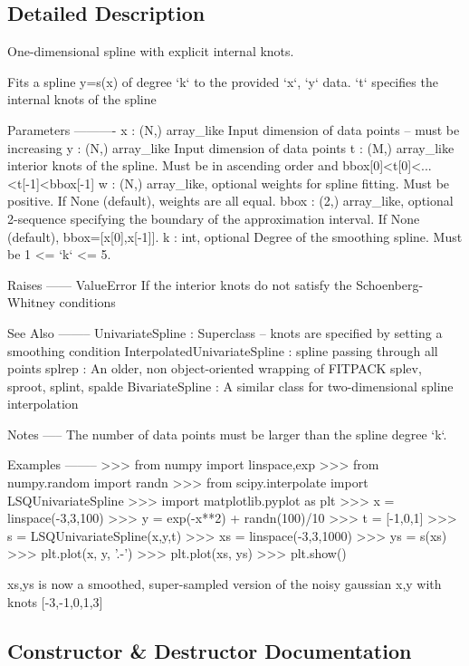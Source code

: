 \subsection{Detailed Description}
\begin{DoxyVerb}One-dimensional spline with explicit internal knots.

Fits a spline y=s(x) of degree `k` to the provided `x`, `y` data.  `t`
specifies the internal knots of the spline

Parameters
----------
x : (N,) array_like
    Input dimension of data points -- must be increasing
y : (N,) array_like
    Input dimension of data points
t : (M,) array_like
    interior knots of the spline.  Must be in ascending order
    and bbox[0]<t[0]<...<t[-1]<bbox[-1]
w : (N,) array_like, optional
    weights for spline fitting.  Must be positive.  If None (default),
    weights are all equal.
bbox : (2,) array_like, optional
    2-sequence specifying the boundary of the approximation interval. If
    None (default), bbox=[x[0],x[-1]].
k : int, optional
    Degree of the smoothing spline.  Must be 1 <= `k` <= 5.

Raises
------
ValueError
    If the interior knots do not satisfy the Schoenberg-Whitney conditions

See Also
--------
UnivariateSpline : Superclass -- knots are specified by setting a
    smoothing condition
InterpolatedUnivariateSpline : spline passing through all points
splrep : An older, non object-oriented wrapping of FITPACK
splev, sproot, splint, spalde
BivariateSpline : A similar class for two-dimensional spline interpolation

Notes
-----
The number of data points must be larger than the spline degree `k`.

Examples
--------
>>> from numpy import linspace,exp
>>> from numpy.random import randn
>>> from scipy.interpolate import LSQUnivariateSpline
>>> import matplotlib.pyplot as plt
>>> x = linspace(-3,3,100)
>>> y = exp(-x**2) + randn(100)/10
>>> t = [-1,0,1]
>>> s = LSQUnivariateSpline(x,y,t)
>>> xs = linspace(-3,3,1000)
>>> ys = s(xs)
>>> plt.plot(x, y, '.-')
>>> plt.plot(xs, ys)
>>> plt.show()

xs,ys is now a smoothed, super-sampled version of the noisy gaussian x,y
with knots [-3,-1,0,1,3]\end{DoxyVerb}
 

\subsection{Constructor \& Destructor Documentation}
\hypertarget{classscipy_1_1interpolate_1_1fitpack2_1_1LSQUnivariateSpline_a9ac6ef67521280296f2b6f44fbc8c536}{}
